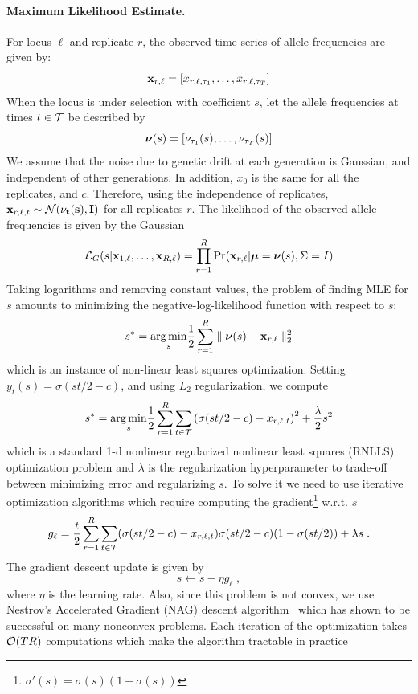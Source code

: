 \paragraph{Maximum Likelihood Estimate.}
For locus $\ell$  and replicate $r$, the observed time-series of 
allele frequencies are given by:
\[
{{\mathbf x}_{r,\ell}} = [x_{r,\ell,\tau_1},\ldots,x_{r,\ell,\tau_T}]
\]
When the locus is under selection with coefficient $s$, let the allele
frequencies at times $t\in {\cal T}$ be described by
\[
{\boldsymbol\nu}(s) = [\nu_{\tau_1}(s),\ldots,\nu_{\tau_T}(s)]
\]
We assume that the noise due to genetic drift at each generation is
Gaussian, and independent of other generations. In addition, $x_0$ is
the same for all the replicates, and $c$. Therefore, using the
independence of replicates, ${\mathbf x}_{r,\ell,t} \sim {\cal N}(\bf\nu_t(s),I)$
for all replicates $r$. The likelihood of the observed allele
frequencies is given by the Gaussian
\begin{equation}
  {\cal L}_G(s|{\mathbf x}_{1,\ell}, \dots,{\mathbf x}_{R,\ell}) = \prod_{r=1}^R \Pr({\mathbf x}_{r,\ell}| {\boldsymbol\mu}={\boldsymbol\nu}(s),
\Sigma= I) 
\end{equation}
Taking logarithms and removing constant values, the problem of finding
MLE for $s$ amounts to minimizing the negative-log-likelihood function
with respect to $s$: 
\begin{equation}
  s^*=\underset{s}{\arg \min} \frac{1}{2} \sum_{r=1}^R \parallel {{\boldsymbol\nu}(s) -
  {\mathbf x}_{r,\ell}} \parallel_2^2
  \label{eq:nlls0}
\end{equation}
which is an instance of non-linear least squares optimization.
Setting $y_t(s)=\sigma(st/2-c)$, and using $L_2$ regularization, we
compute
\begin{equation}
  s^*=\underset{s}{\arg \min} \frac{1}{2}  \sum_{r=1}^R\sum_{t\in {\cal T}} \left( \sigma(st/2-c)- x_{r,\ell,t} \right)^2 + \frac{\lambda }{2}s^2
\end{equation}
which is a standard 1-d nonlinear regularized nonlinear least squares
(RNLLS) optimization problem and $\lambda$ is the regularization
hyperparameter to trade-off between minimizing error and regularizing
$s$. To solve it we need to use iterative optimization algorithms
which require computing the 
gradient\footnote{$\sigma'(s)=\sigma(s)(1-\sigma(s))$} w.r.t. $s$
\begin{equation}
g_\ell= \frac{t}{2}  \sum_{r=1}^R \sum_{t\in {\cal T}}  ( \sigma(st/2-c)- x_{r,\ell,t} ) \sigma(st/2-c) (1-\sigma(st/2)) + \lambda s\; .
  \label{eq:grad}
\end{equation}
The gradient descent update is given by
\begin{equation}
  s\leftarrow s - \eta  g_\ell\;,
\end{equation}
where $\eta$ is the learning rate. Also, since this problem is not
convex, we use Nestrov's Accelerated Gradient (NAG) descent
algorithm~\cite{sutskever2013} which has shown to be successful on
many nonconvex problems. Each iteration of the optimization takes
${\cal O}(TR)$ computations which make the algorithm tractable in practice

